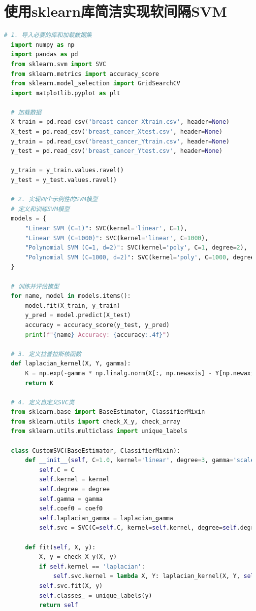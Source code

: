 \documentclass[12pt]{article}
\begin{document}
\section{使用sklearn库简洁实现软间隔SVM}
\begin{lstlisting}[language=python]
  # 1. 导入必要的库和加载数据集
  import numpy as np
  import pandas as pd
  from sklearn.svm import SVC
  from sklearn.metrics import accuracy_score
  from sklearn.model_selection import GridSearchCV
  import matplotlib.pyplot as plt
  
  # 加载数据
  X_train = pd.read_csv('breast_cancer_Xtrain.csv', header=None)
  X_test = pd.read_csv('breast_cancer_Xtest.csv', header=None)
  y_train = pd.read_csv('breast_cancer_Ytrain.csv', header=None)
  y_test = pd.read_csv('breast_cancer_Ytest.csv', header=None)
  
  y_train = y_train.values.ravel()
  y_test = y_test.values.ravel()
  
  # 2. 实现四个示例性的SVM模型
  # 定义和训练SVM模型
  models = {
      "Linear SVM (C=1)": SVC(kernel='linear', C=1),
      "Linear SVM (C=1000)": SVC(kernel='linear', C=1000),
      "Polynomial SVM (C=1, d=2)": SVC(kernel='poly', C=1, degree=2),
      "Polynomial SVM (C=1000, d=2)": SVC(kernel='poly', C=1000, degree=2)
  }
  
  # 训练并评估模型
  for name, model in models.items():
      model.fit(X_train, y_train)
      y_pred = model.predict(X_test)
      accuracy = accuracy_score(y_test, y_pred)
      print(f"{name} Accuracy: {accuracy:.4f}")
  
  # 3. 定义拉普拉斯核函数
  def laplacian_kernel(X, Y, gamma):
      K = np.exp(-gamma * np.linalg.norm(X[:, np.newaxis] - Y[np.newaxis, :], axis=2))
      return K
  
  # 4. 定义自定义SVC类
  from sklearn.base import BaseEstimator, ClassifierMixin
  from sklearn.utils import check_X_y, check_array
  from sklearn.utils.multiclass import unique_labels
  
  class CustomSVC(BaseEstimator, ClassifierMixin):
      def __init__(self, C=1.0, kernel='linear', degree=3, gamma='scale', coef0=0.0, laplacian_gamma=1.0):
          self.C = C
          self.kernel = kernel
          self.degree = degree
          self.gamma = gamma
          self.coef0 = coef0
          self.laplacian_gamma = laplacian_gamma
          self.svc = SVC(C=self.C, kernel=self.kernel, degree=self.degree, gamma=self.gamma, coef0=self.coef0)
      
      def fit(self, X, y):
          X, y = check_X_y(X, y)
          if self.kernel == 'laplacian':
              self.svc.kernel = lambda X, Y: laplacian_kernel(X, Y, self.laplacian_gamma)
          self.svc.fit(X, y)
          self.classes_ = unique_labels(y)
          return self
      

\end{lstlisting}
\end{document}
